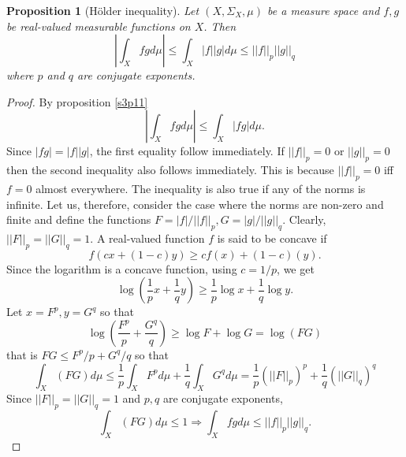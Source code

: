 \documentclass{article}
\theoremstyle{plain}
\numberwithin{thm}{section}
\theoremstyle{plain}
\newtheorem{prop}{Proposition}
\numberwithin{prop}{section}
\theoremstyle{definition}
\numberwithin{defn}{section}
\theoremstyle{remark}
\theoremstyle{plain}
\numberwithin{cor}{section}
\numberwithin{equation}{section}
\begin{document}
\begin{prop}[H\"{o}lder inequality]\label{s5p1}
Let $(X, \Sigma_X, \mu)$ be a measure space and $f, g$ be real-valued
measurable functions on $X$. Then 
\[
\left|\int_X fgd\mu\right| \le \int_X |f||g| d\mu \le ||f||_p||g||_q
\]
where $p$ and $q$ are conjugate exponents.
\end{prop}
\begin{proof}
By proposition \ref{s3p11}
\[
\left|\int_X fg d\mu\right| \le \int_X |fg| d\mu.
\]
Since $|fg| = |f||g|$, the first equality follow immediately. If $||f||_p
= 0$ or $||g||_p = 0$ then the second inequality also follows immediately.
This is because $||f||_p = 0$ iff $f = 0$ almost everywhere. The
inequality is also true if any of the norms is infinite. Let us, therefore,
consider the case where the norms are non-zero and finite and define the
functions $F = |f|/||f||_p, G = |g|/||g||_q$. Clearly, $||F||_p = ||G||_q
= 1$.  A real-valued function $f$ is said to be concave if 
\[
f(cx + (1 - c)y) \ge cf(x) + (1 - c)(y).
\]
Since the logarithm is a concave function, using $c = 1/p$, we get
\[
\log\left(\frac{1}{p}x + \frac{1}{q}y\right) \ge \frac{1}{p}\log x +
\frac{1}{q}\log y.
\]
Let $x = F^p, y = G^q$ so that
\[
\log\left(\frac{F^p}{p} + \frac{G^q}{q}\right) \ge \log F + \log G
= \log (FG)
\]
that is $FG \le F^p/p + G^q/q$ so that
\[
\int_X (FG) d\mu \le \frac{1}{p}\int_X F^p d\mu + \frac{1}{q}\int_X G^q
d\mu = \frac{1}{p}(||F||_p)^p + \frac{1}{q}(||G||_q)^q
\]
Since $||F||_p = ||G||_q = 1$ and $p, q$ are conjugate exponents,
\[
\int_X (FG) d\mu \le 1 \Rightarrow \int_X fg d\mu \le ||f||_p ||g||_q.
\]
\end{proof}
\end{document}

